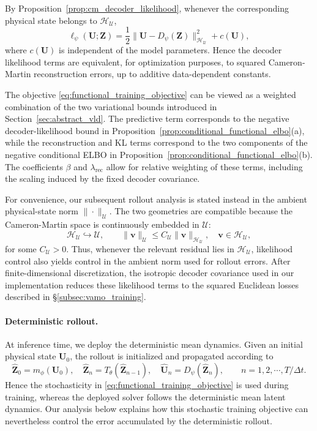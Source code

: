 \documentclass[11pt]{article}
\begin{document}
By Proposition~\ref{prop:cm_decoder_likelihood}, whenever the corresponding physical state belongs to $\mathcal H_{\mathcal U}$,
\[
    \ell_\psi(\mathbf U;\mathbf Z)
    =\frac12
    \|\mathbf U-D_\psi(\mathbf Z)\|_{\mathcal H_{\mathcal U}}^2
    + c(\mathbf U),
\]
where $c(\mathbf U)$ is independent of the model parameters. Hence the decoder likelihood terms are equivalent, for optimization purposes, to squared Cameron-Martin reconstruction errors, up to additive data-dependent constants.

The objective \eqref{eq:functional_training_objective} can be viewed as a weighted combination of the two variational bounds introduced in Section~\ref{sec:abstract_vld}. The predictive term corresponds to the negative decoder-likelihood bound in
Proposition~\ref{prop:conditional_functional_elbo}(a), while the reconstruction and KL terms correspond to the two components of the negative conditional ELBO in
Proposition~\ref{prop:conditional_functional_elbo}(b). The coefficients $\beta$ and $\lambda_{\mathrm{rec}}$ allow for relative weighting of these terms, including the scaling induced by the fixed decoder covariance.

For convenience, our subsequent rollout analysis is stated instead in the ambient physical-state norm $\|\cdot\|_{\mathcal U}$. The two geometries are compatible because the Cameron-Martin space is continuously embedded in $\mathcal U$:
\[
    \mathcal H_{\mathcal U}\hookrightarrow\mathcal U,
    \qquad
    \|\mathbf v\|_{\mathcal U}
    \leq
    C_{\mathcal U}
    \|\mathbf v\|_{\mathcal H_{\mathcal U}},
    \quad
    \mathbf v\in\mathcal H_{\mathcal U},
\]
for some $C_{\mathcal U}>0$. Thus, whenever the relevant residual lies in $\mathcal H_{\mathcal U}$, likelihood control also yields control in the ambient norm used for rollout errors. After finite-dimensional discretization, the isotropic decoder covariance used in our implementation reduces these likelihood terms to the squared Euclidean losses described in \S\ref{subsec:vamo_training}.

\paragraph{Deterministic rollout.} At inference time, we deploy the deterministic mean dynamics. Given an initial physical state $\mathbf U_0$, the rollout is initialized and propagated according to
\begin{equation}
    \widehat{\mathbf Z}_0
    =
    m_\phi(\mathbf U_0),
    \quad
    \widehat{\mathbf Z}_n
    =
    T_\theta(\widehat{\mathbf Z}_{n-1}),
    \quad
    \widehat{\mathbf U}_n
    =
    D_\psi(\widehat{\mathbf Z}_n),\qquad n=1,2,\cdots,T/\Delta t.
    \label{eq:deterministic_mean_rollout}
\end{equation}
Hence the stochasticity in \eqref{eq:functional_training_objective} is used during training, whereas the deployed solver follows the deterministic mean latent dynamics. Our analysis below explains how this stochastic training objective can nevertheless control the error accumulated by the deterministic rollout.
\end{document}
